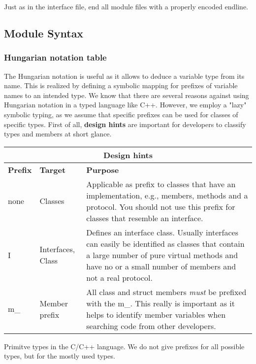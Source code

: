 Just as in the interface file, end all module files with a properly encoded endline.


\subsection{Module Syntax}

\subsubsection{Hungarian notation table}\label{sec:HungarianNotation}
The Hungarian notation is useful as it allows to deduce a variable type from its name.
This is realized by defining a symbolic mapping for prefixes of variable names to an intended type.
We know that there are several reasons against using Hungarian notation in a typed language like C++.
However, we employ a "lazy" symbolic typing, as we assume that specific prefixes can be used for classes of specific types.
First of all, \textbf{design hints} are important for developers to classify types and members at short glance.


\begin{tabular}{|l|l|p{10cm}|}
\multicolumn{3}{c}{\textbf{Design hints}}\\\hline
\textbf{Prefix} & \textbf{Target} & \textbf{Purpose} \\\hline

none   & Classes & Applicable as prefix to classes that have an implementation,
              e.g., members, methods and a protocol. You should not use
              this prefix for classes that resemble an interface.\\\hline
I   & Interfaces, Class & Defines an interface class. Usually interfaces
                        can easily be identified as classes that contain
                        a large number of pure virtual methods and have
                        no or a small number of members and not a real
                        protocol.\\\hline
m\_ & Member prefix & All class and struct members \emph{must} be prefixed
                      with the m\_. This really is important as it helps
                      to identify member variables when searching code
                      from other developers.\\\hline
\end{tabular}

Primitve types in the C/C++ language. 
We do not give prefixes for all possible types, but for the mostly used types.

